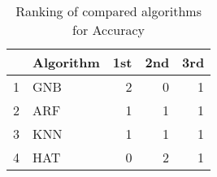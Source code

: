 \begin{table}
\footnotesize
\caption{Ranking of compared algorithms for Accuracy}
\label{tab:places Accuracy}
\begin{tabular}{llrrr}
\hline
 & Algorithm & 1st & 2nd & 3rd \\
\hline
1 & GNB & 2 & 0 & 1 \\
2 & ARF & 1 & 1 & 1 \\
3 & KNN & 1 & 1 & 1 \\
4 & HAT & 0 & 2 & 1 \\
\hline
\end{tabular}
\end{table}
